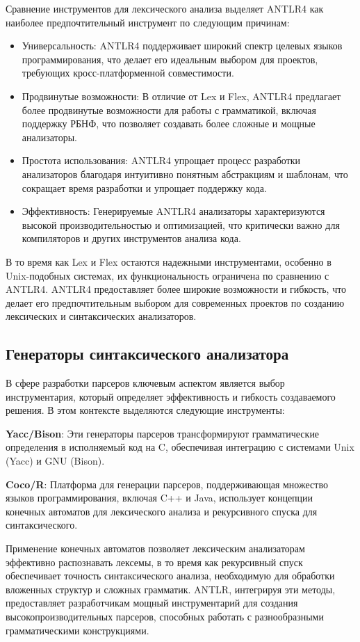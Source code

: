Сравнение инструментов для лексического анализа выделяет ANTLR4 как наиболее предпочтительный инструмент по следующим причинам:
\begin{itemize}[label = ---]
    \item Универсальность: ANTLR4 поддерживает широкий спектр целевых языков программирования, что делает его идеальным выбором для проектов, требующих кросс-платформенной совместимости. \cite{4}
    \item Продвинутые возможности: В отличие от Lex и Flex, ANTLR4 предлагает более продвинутые возможности для работы с грамматикой, включая поддержку РБНФ, что позволяет создавать более сложные и мощные анализаторы.
    \item Простота использования: ANTLR4 упрощает процесс разработки анализаторов благодаря интуитивно понятным абстракциям и шаблонам, что сокращает время разработки и упрощает поддержку кода.
    \item Эффективность: Генерируемые ANTLR4 анализаторы характеризуются высокой производительностью и оптимизацией, что критически важно для компиляторов и других инструментов анализа кода.
\end{itemize}
    
В то время как Lex и Flex остаются надежными инструментами, особенно в Unix-подобных системах, их функциональность ограничена по сравнению с ANTLR4. ANTLR4 предоставляет более широкие возможности и гибкость, что делает его предпочтительным выбором для современных проектов по созданию лексических и синтаксических анализаторов.

\subsection{Генераторы синтаксического анализатора}
В сфере разработки парсеров ключевым аспектом является выбор инструментария, который определяет эффективность и гибкость создаваемого решения. В этом контексте выделяются следующие инструменты:

\textbf{Yacc/Bison}: Эти генераторы парсеров трансформируют грамматические определения в исполняемый код на C, обеспечивая интеграцию с системами Unix (Yacc) и GNU (Bison). \cite{5}

\textbf{Coco/R}: Платформа для генерации парсеров, поддерживающая множество языков программирования, включая C++ и Java, использует концепции конечных автоматов для лексического анализа и рекурсивного спуска для синтаксического.

Применение конечных автоматов позволяет лексическим анализаторам эффективно распознавать лексемы, в то время как рекурсивный спуск обеспечивает точность синтаксического анализа, необходимую для обработки вложенных структур и сложных грамматик. ANTLR, интегрируя эти методы, предоставляет разработчикам мощный инструментарий для создания высокопроизводительных парсеров, способных работать с разнообразными грамматическими конструкциями.

